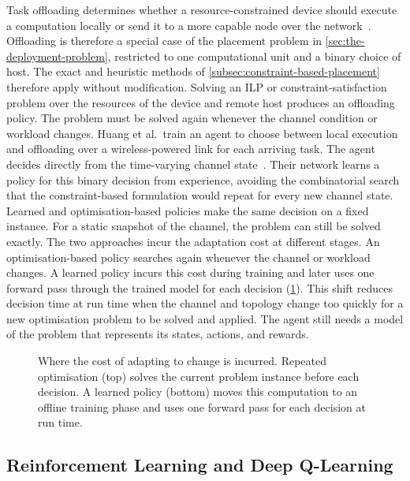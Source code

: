 Task offloading determines whether a resource-constrained device should execute a computation locally or send it to a more capable node over the network~\cite{DBLP:journals/csur/Ait-SalahtDL20}.
%
Offloading is therefore a special case of the placement problem in \cref{sec:the-deployment-problem},
restricted to one computational unit and a binary choice of host.
%
The exact and heuristic methods of \cref{subsec:constraint-based-placement} therefore apply without modification.
Solving an \ac{ILP} or constraint-satisfaction problem over the resources of the device and remote host produces an offloading policy.
The problem must be solved again whenever the channel condition or workload changes.
%
Huang et al.\ train an agent to choose between local execution and offloading over a wireless-powered link for each arriving task.
The agent decides directly from the time-varying channel state~\cite{DBLP:journals/tmc/HuangBZ20}.
%
Their network learns a policy for this binary decision from experience,
avoiding the combinatorial search that the constraint-based formulation would repeat for every new channel state.
%
Learned and optimisation-based policies make the same decision on a fixed instance.
For a static snapshot of the channel, the problem can still be solved exactly.
%
The two approaches incur the adaptation cost at different stages.
%
An optimisation-based policy searches again whenever the channel or workload changes.
%
A learned policy incurs this cost during training and later uses one forward pass through the trained model for each decision (\cref{fig:cost-shift}).
%
This shift reduces decision time at run time when the channel and topology change too quickly for a new optimisation problem to be solved and applied.
%
The agent still needs a model of the problem that represents its states, actions, and rewards.
%

\begin{figure}[t]
    \centering
    
    \caption[Where the cost of adapting to change is incurred]{Where the cost of adapting to change is incurred. Repeated optimisation (top) solves the current problem instance before each decision. A learned policy (bottom) moves this computation to an offline training phase and uses one forward pass for each decision at run time.}
    \label{fig:cost-shift}
\end{figure}

\subsection{Reinforcement Learning and Deep Q-Learning}
\label{subsec:reinforcement-learning}


